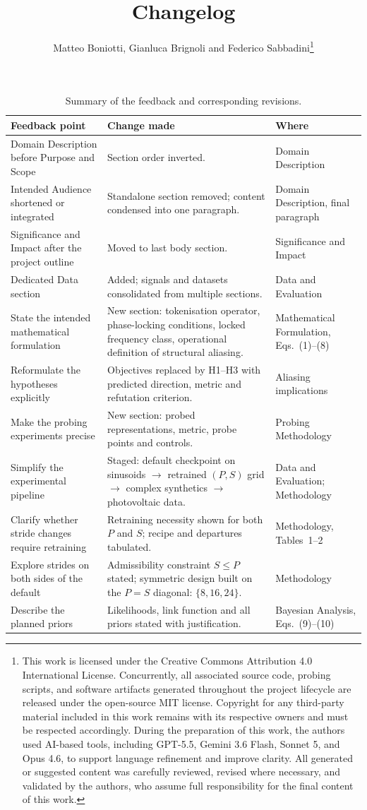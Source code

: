 \documentclass[
	letterpaper, %
	10pt, %
	unnumberedsections, %
	twoside, %
]{LTJournalArticle}
\title{Changelog} %
\author{
	Matteo Boniotti, Gianluca Brignoli and Federico Sabbadini\thanks{This work is licensed under the Creative Commons Attribution 4.0 International License. Concurrently, all associated source code, probing scripts, and software artifacts generated throughout the project lifecycle are released under the open-source MIT license. \newline Copyright for any third-party material included in this work remains with its respective owners and must be respected accordingly. \newline \newline During the preparation of this work, the authors used AI-based tools, including GPT-5.5, Gemini 3.6 Flash, Sonnet 5, and Opus 4.6, to support language refinement and improve clarity. All generated or suggested content was carefully reviewed, revised where necessary, and validated by the authors, who assume full responsibility for the final content of this work.}
}
\renewcommand{\arraystretch}{1.75}
\begin{document}
 
\maketitle %
 
\begin{table}[!b]
\centering
\small
\renewcommand{\arraystretch}{1.4}
\begin{tabular}{@{} m{3.8cm} m{7.4cm} m{3.2cm} @{}}
\toprule
\textbf{Feedback point} & \textbf{Change made} & \textbf{Where} \\
\midrule
Domain Description before Purpose and Scope
  & Section order inverted.
  & Domain Description \\
\hline
Intended Audience shortened or integrated
  & Standalone section removed; content condensed into one paragraph.
  & Domain Description, final paragraph \\
\hline
Significance and Impact after the project outline
  & Moved to last body section.
  & Significance and Impact \\
\hline
Dedicated Data section
  & Added; signals and datasets consolidated from multiple sections.
  & Data and Evaluation \\
\hline
State the intended mathematical formulation
  & New section: tokenisation operator, phase-locking conditions, locked
    frequency class, operational definition of structural aliasing.
  & Mathematical Formulation, Eqs.~(1)--(8) \\
\hline
Reformulate the hypotheses explicitly
  & Objectives replaced by H1--H3 with predicted direction, metric and
    refutation criterion.
  & Aliasing implications \\
\hline
Make the probing experiments precise
  & New section: probed representations, metric, probe points and controls.
  & Probing Methodology \\
\hline
Simplify the experimental pipeline
  & Staged: default checkpoint on sinusoids $\to$ retrained $(P,S)$ grid
    $\to$ complex synthetics $\to$ photovoltaic data.
  & Data and Evaluation; Methodology \\
\hline
Clarify whether stride changes require retraining
  & Retraining necessity shown for both $P$ and $S$; recipe and departures
    tabulated.
  & Methodology, Tables~1--2 \\
\hline
Explore strides on both sides of the default
  & Admissibility constraint $S \le P$ stated; symmetric design built on the
    $P{=}S$ diagonal: $\{8,16,24\}$.
  & Methodology \\
\hline
Describe the planned priors
  & Likelihoods, link function and all priors stated with justification.
  & Bayesian Analysis, Eqs.~(9)--(10) \\
\bottomrule
\end{tabular}
\caption{Summary of the feedback and corresponding revisions.}
\label{tab:changelog}
\end{table}
\end{document}

